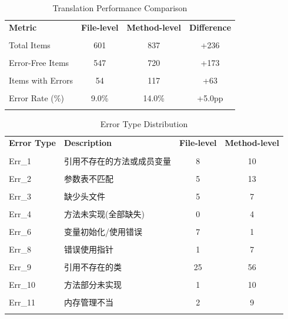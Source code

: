 
\begin{table}[h]
\centering
\caption{Translation Performance Comparison}
\label{tab:performance-comparison}
\begin{tabular}{lccc}
\toprule
\textbf{Metric} & \textbf{File-level} & \textbf{Method-level} & \textbf{Difference} \\\\
\midrule
Total Items & 601 & 837 & +236 \\\\
Error-Free Items & 547 & 720 & +173 \\\\
Items with Errors & 54 & 117 & +63 \\\\
Error Rate (\%) & 9.0\% & 14.0\% & +5.0pp \\\\
\bottomrule
\end{tabular}
\end{table}

\begin{table}[h]
\centering
\caption{Error Type Distribution}
\label{tab:error-distribution}
\small
\begin{tabular}{llcc}
\toprule
\textbf{Error Type} & \textbf{Description} & \textbf{File-level} & \textbf{Method-level} \\\\
\midrule
Err_1 & 引用不存在的方法或成员变量 & 8 & 10 \\\\
Err_2 & 参数表不匹配 & 5 & 13 \\\\
Err_3 & 缺少头文件 & 5 & 7 \\\\
Err_4 & 方法未实现(全部缺失) & 0 & 4 \\\\
Err_6 & 变量初始化/使用错误 & 7 & 1 \\\\
Err_8 & 错误使用指针 & 1 & 7 \\\\
Err_9 & 引用不存在的类 & 25 & 56 \\\\
Err_10 & 方法部分未实现 & 1 & 10 \\\\
Err_11 & 内存管理不当 & 2 & 9 \\\\
\bottomrule
\end{tabular}
\end{table}


